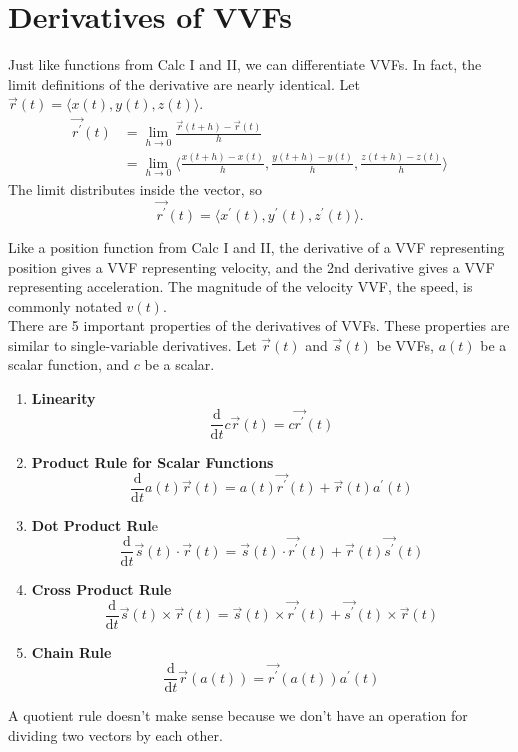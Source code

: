 \section{Derivatives of VVFs}
\noindent
Just like functions from Calc I and II, we can differentiate VVFs.
In fact, the limit definitions of the derivative are nearly identical.
Let $\vec{r}(t) = \langle x(t), y(t), z(t) \rangle$.
\begin{align*}
	\vec{r^\prime}(t) &= \lim_{h\to 0}{\frac{\vec{r}(t+h)-\vec{r}(t)}{h}} \\
	&= \lim_{h\to 0}{\bigg\langle \frac{x(t+h)-x(t)}{h}, \frac{y(t+h)-y(t)}{h}, \frac{z(t+h)-z(t)}{h} \bigg\rangle}
\end{align*}
The limit distributes inside the vector, so
\begin{equation*}
	\vec{r^\prime}(t) = \langle x^{\prime}(t), y^{\prime}(t), z^{\prime}(t) \rangle.
\end{equation*}

\noindent
Like a position function from Calc I and II, the derivative of a VVF representing position gives a VVF representing velocity, and the 2nd derivative gives a VVF representing acceleration.
The magnitude of the velocity VVF, the speed, is commonly notated $v(t)$.\\

\noindent
There are 5 important properties of the derivatives of VVFs.
These properties are similar to single-variable derivatives.
Let $\vec{r}(t)$ and $\vec{s}(t)$ be VVFs, $a(t)$ be a scalar function, and $c$ be a scalar.
\begin{enumerate}[label=]
	\item \textbf{Linearity}
	\begin{equation*}
		\frac{\mathrm{d}}{\mathrm{d}t}c\vec{r}(t) = c\vec{r^\prime}(t)	
	\end{equation*}
	\item \textbf{Product Rule for Scalar Functions}
	\begin{equation*}
		\frac{\mathrm{d}}{\mathrm{d}t}a(t)\vec{r}(t) = a(t)\vec{r^\prime}(t) + \vec{r}(t)a^{\prime}(t)
	\end{equation*}
	\item \textbf{Dot Product Rul}e
	\begin{equation*}
		\frac{\mathrm{d}}{\mathrm{d}t}\vec{s}(t)\cdot\vec{r}(t) = \vec{s}(t)\cdot\vec{r^\prime}(t) + \vec{r}(t)\vec{s^\prime}(t)	
	\end{equation*}
	\item \textbf{Cross Product Rule}
	\begin{equation*}
		\frac{\mathrm{d}}{\mathrm{d}t}\vec{s}(t)\times\vec{r}(t) = \vec{s}(t)\times\vec{r^\prime}(t) + \vec{s^\prime}(t)\times\vec{r}(t)	
	\end{equation*}
	\item \textbf{Chain Rule}
	\begin{equation*}
		\frac{\mathrm{d}}{\mathrm{d}t}\vec{r}(a(t)) = \vec{r^\prime}(a(t))a^{\prime}(t)
	\end{equation*}
\end{enumerate}
A quotient rule doesn't make sense because we don't have an operation for dividing two vectors by each other.\\

